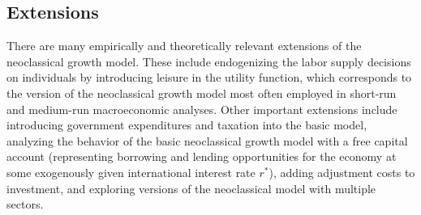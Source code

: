 \documentclass[\topdir/lecture\_notes.tex]{subfiles}
\begin{document}


\subsection{Extensions}
There are many empirically and theoretically relevant extensions of the neoclassical growth model. These include endogenizing the labor supply decisions on individuals by introducing leisure in the utility function, which corresponds to the version of the neoclassical growth model most often employed in short-run and medium-run macroeconomic analyses. Other important extensions include introducing government expenditures and taxation into the basic model, analyzing the behavior of the basic neoclassical growth model with a free capital account (representing borrowing and lending opportunities for the economy at some exogenously given international interest rate \(r^{*}\)), adding adjustment costs to investment, and exploring versions of the neoclassical model with multiple sectors.
\end{document}
